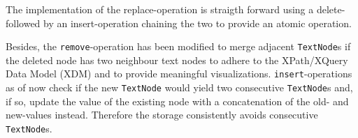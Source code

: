 


The implementation of the replace-operation is straigth forward using a delete- followed by an insert-operation chaining the two to provide an atomic operation.

Besides, the \texttt{remove}-operation has been modified to merge adjacent \texttt{TextNode}s if the deleted node has two neighbour text nodes to adhere to the XPath/XQuery Data Model (XDM) and to provide meaningful visualizations. \texttt{insert}-operations as of now check if the new \texttt{TextNode} would yield two consecutive \texttt{TextNode}s and, if so, update the value of the existing node with a concatenation of the old- and new-values instead. Therefore the storage consistently avoids consecutive \texttt{TextNode}s. 


